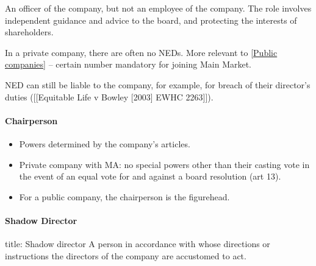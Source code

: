 \documentclass[
]{article}
\newenvironment{Shaded}{}{}
\newcommand{\NormalTok}[1]{#1}
\providecommand{\tightlist}{%
  \setlength{\itemsep}{0pt}\setlength{\parskip}{0pt}}
\begin{document}
An officer of the company, but not an employee of the company. The role
involves independent guidance and advice to the board, and protecting
the interests of shareholders.

In a private company, there are often no NEDs. More relevant to
{[}\protect\hyperlink{public-companies}{Public companies}{]} -- certain
number mandatory for joining Main Market.

NED can still be liable to the company, for example, for breach of their
director's duties ({[}{[}Equitable Life v Bowley {[}2003{]} EWHC
2263{]}{]}).

\hypertarget{chairperson}{%
\paragraph{Chairperson}\label{chairperson}}

\begin{itemize}
\tightlist
\item
  Powers determined by the company's articles.
\item
  Private company with MA: no special powers other than their casting
  vote in the event of an equal vote for and against a board resolution
  (art 13).
\item
  For a public company, the chairperson is the figurehead.
\end{itemize}

\hypertarget{shadow-director}{%
\paragraph{Shadow Director}\label{shadow-director}}

\begin{Shaded}
\begin{Highlighting}[]
\NormalTok{title: Shadow director}
\NormalTok{A person in accordance with whose directions or instructions the directors of the company are accustomed to act.}
\end{Highlighting}
\end{Shaded}
\end{document}

